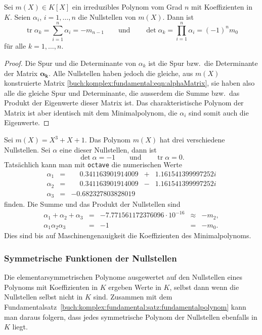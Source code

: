 \begin{korollar}
Sei $m(X)\in K[X]$ ein irreduzibles Polynom vom Grad $n$ mit Koeffizienten
in $K$.
Seien $\alpha_i$, $i=1,\dots,n$ die Nullstellen von $m(X)$.
Dann ist
\[
\operatorname{tr}\alpha_k
=
\sum_{i=1}^n \alpha_i
=
-m_{n-1}
\qquad\text{und}\qquad
\det \alpha_k
=
\prod_{i=1}^n \alpha_i
=
(-1)^nm_0
\]
für alle $k=1,\dots,n$.
\end{korollar}

\begin{proof}
Die Spur und die Determinante von $\alpha_k$ ist die Spur bzw.~die Determinante
der Matrix $\bm{\alpha_k}$.
Alle Nullstellen haben jedoch die gleiche, aus $m(X)$ konstruierte Matrix
\eqref{buch:komplex:fundamental:eqn:alphaMatrix},
sie haben also alle die gleiche Spur und Determinante, die ausserdem
die Summe bzw.~das Produkt der Eigenwerte dieser Matrix ist.
Das charakteristische Polynom der Matrix ist aber identisch mit dem
Minimalpolynom, die $\alpha_i$ sind somit auch die Eigenwerte.
%
\end{proof}

\begin{beispiel}
Sei $m(X) = X^3 + X + 1$.
Das Polynom $m(X)$ hat drei verschiedene Nullstellen.
Sei $\alpha$ eine dieser Nullstellen, dann ist
\[
\det \alpha = -1
\qquad\text{und}\qquad
\operatorname{tr}\alpha = 0.
\]
Tatsächlich kann man mit \texttt{octave} die numerischen Werte
%
\[
\renewcommand{\arraycolsep}{2pt}
\begin{array}{rclcl}
\alpha_1 &=& \phantom{-}0.341163901914009 &+& 1.161541399997252i \\
\alpha_2 &=& \phantom{-}0.341163901914009 &-& 1.161541399997252i \\
\alpha_3 &=&           -0.682327803828019 & &
\end{array}
\]
finden.
Die Summe und das Produkt der Nullstellen sind
\[
\renewcommand{\arraycolsep}{2pt}
\begin{array}{rclcl}
\alpha_1+\alpha_2+\alpha_3 &=& -7.771561172376096\cdot 10^{-16} &\approx& -m_2,\\
\alpha_1\alpha_2\alpha_3   &=& -1                               &=&-m_0.
\end{array}
\]
Dies sind bis auf Maschinengenauigkeit die Koeffizienten des
Minimalpolynoms.
\end{beispiel}

%
%
\subsubsection{Symmetrische Funktionen der Nullstellen}
Die elementarsymmetrischen Polynome ausgewertet auf den Nullstellen
eines Polynoms mit Koeffizienten in $K$ ergeben Werte in $K$, selbst
dann wenn die Nullstellen selbst nicht in $K$ sind.
Zusammen mit dem
Fundamentalsatz~\ref{buch:komplex:fundamental:satz:fundamentalpolynom}
kann man daraus folgern, dass jedes symmetrische Polynom der Nullstellen
ebenfalls in $K$ liegt.

